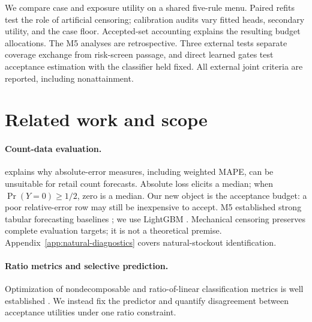 \documentclass{article}
\begin{document}
We compare case and exposure utility on a shared five-rule menu. Paired refits test the role of artificial censoring; calibration audits vary fitted heads, secondary utility, and the case floor. Accepted-set accounting explains the resulting budget allocations. The M5 analyses are retrospective. Three external tests separate coverage exchange from risk-screen passage, and direct learned gates test acceptance estimation with the classifier held fixed. All external joint criteria are reported, including nonattainment.

\section{Related work and scope}
\paragraph{Count-data evaluation.}
\citet{kolassa2016count} explains why absolute-error measures, including weighted MAPE, can be unsuitable for retail count forecasts. Absolute loss elicits a median; when $\Pr(Y=0)\geq1/2$, zero is a median. Our new object is the acceptance budget: a poor relative-error row may still be inexpensive to accept. M5 established strong tabular forecasting baselines \citep{makridakis2022m5}; we use LightGBM \citep{ke2017lightgbm}. Mechanical censoring preserves complete evaluation targets; it is not a theoretical premise. Appendix~\ref{app:natural-diagnostics} covers natural-stockout identification.

\paragraph{Ratio metrics and selective prediction.}
Optimization of nondecomposable and ratio-of-linear classification metrics is well established \citep{dinkelbach1967,koyejo2014,narasimhan2015complex,bao2020fractional}. We instead fix the predictor and quantify disagreement between acceptance utilities under one ratio constraint.
\end{document}
